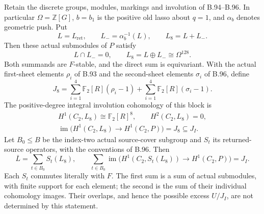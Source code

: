 \label{stmt:B97}
Retain the discrete groups, modules, markings and involution of
B.94--B.96.  In particular $\Omega=\mathbb Z[G]$, $b=b_1$ is the
positive old lasso about $q=1$, and $\alpha_b$ denotes geometric push.
Put
\[
 L=L_{\mathrm{ret}},\qquad L_-=\alpha_b^{-1}(L),\qquad
 L_8=L+L_-.
\]
Then these actual submodules of $P$ satisfy
\begin{equation}\label{eq:B97-block}
 L\cap L_-=0,\qquad L_8=L\oplus L_-\cong\Omega^{128}.
\end{equation}
Both summands are $F$-stable, and the direct sum is equivariant.
With the actual first-sheet elements $\rho_i$ of B.93 and the
second-sheet elements $\sigma_i$ of B.96, define
\[
 J_8=\sum_{i=1}^4\mathbb F_2[R](\rho_i-1)
       +\sum_{i=1}^4\mathbb F_2[R](\sigma_i-1).
\]
The positive-degree integral involution cohomology of this block is
\begin{equation}\label{eq:B97-cohomology}
 \begin{gathered}
 H^1(C_2,L_8)\cong\mathbb F_2[R]^8,
 \qquad H^2(C_2,L_8)=0,\\
 \operatorname{im}\bigl(H^1(C_2,L_8)\longrightarrow H^1(C_2,P)\bigr)
       =J_8\subseteq J_I.
 \end{gathered}
\end{equation}
Let $B_0\leq B$ be the index-two actual source-cover subgroup and
$S_t$ its returned-source operators, with the conventions of B.96.
Then
\begin{equation}\label{eq:B97-source-orbit}
 \overline L=\sum_{t\in B_0}S_t(L_8),\qquad
 \sum_{t\in B_0}\operatorname{im}\bigl(H^1(C_2,S_t(L_8))
                  \longrightarrow H^1(C_2,P)\bigr)=J_I.
\end{equation}
Each $S_t$ commutes literally with $F$.  The first sum is a sum of
actual submodules, with finite support for each element; the second
is the sum of their individual cohomology images.  Their overlaps,
and hence the possible excess $U/J_I$, are not determined by this
statement.

